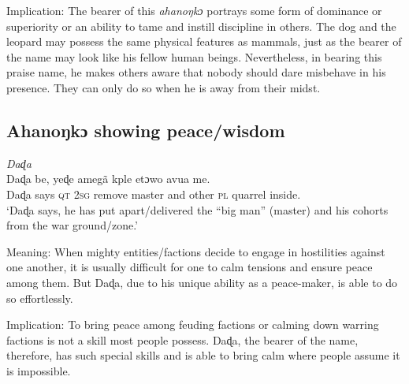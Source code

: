 \documentclass[output=paper]{langscibook}
\begin{document}
Implication: The bearer of this {\textit{ahanoŋkɔ}} portrays some form of dominance or superiority or an ability to tame and instill discipline in others. The dog and the leopard may possess the same physical features as mammals, just as the bearer of the name may look like his fellow human beings. Nevertheless, in bearing this praise name, he makes others aware that nobody should dare misbehave in his presence. They can only do so when he is away from their midst.
\subsection{Ahanoŋkɔ showing peace/wisdom}


\ea \emph{Daɖa}\\
\gll Daɖa be, yeɖe amegã kple etɔwo avua me.\\
Daɖa {says \textsc{qt}} {\textsc{2sg} remove} master and {other \textsc{pl}} quarrel inside.\\
\glt  ‘Daɖa says, he has put apart/delivered the “big man” (master) and his cohorts from the war ground/zone.'
\z

\noindent Meaning: When mighty entities/factions decide to engage in hostilities against one another, it is usually difficult for one to calm tensions and ensure peace among them. But Daɖa, due to his unique ability as a peace-maker, is able to do so effortlessly.

Implication: To bring peace among feuding factions or calming down warring factions is not a skill most people possess. Daɖa, the bearer of the name, therefore, has such special skills and is able to bring calm where people assume it is impossible.  
\end{document}
